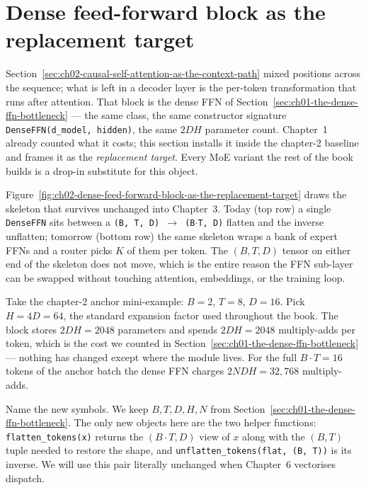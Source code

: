 \section{Dense feed-forward block as the replacement target}
\label{sec:ch02-dense-feed-forward-block-as-the-replacement-target}

Section~\ref{sec:ch02-causal-self-attention-as-the-context-path} mixed positions across the sequence; what is left in a decoder layer is the per-token transformation that runs after attention. That block is the dense FFN of Section~\ref{sec:ch01-the-dense-ffn-bottleneck} --- the same class, the same constructor signature \texttt{DenseFFN(d\_model, hidden)}, the same $2 D H$ parameter count. Chapter~1 already counted what it costs; this section installs it inside the chapter-2 baseline and frames it as the \emph{replacement target}. Every MoE variant the rest of the book builds is a drop-in substitute for this object.



Figure~\ref{fig:ch02-dense-feed-forward-block-as-the-replacement-target} draws the skeleton that survives unchanged into Chapter~3. Today (top row) a single \texttt{DenseFFN} sits between a \texttt{(B, T, D) $\to$ (B$\cdot$T, D)} flatten and the inverse unflatten; tomorrow (bottom row) the same skeleton wraps a bank of expert FFNs and a router picks $K$ of them per token. The $(B, T, D)$ tensor on either end of the skeleton does not move, which is the entire reason the FFN sub-layer can be swapped without touching attention, embeddings, or the training loop.

Take the chapter-2 anchor mini-example: $B = 2$, $T = 8$, $D = 16$. Pick $H = 4 D = 64$, the standard expansion factor used throughout the book. The block stores $2 D H = 2048$ parameters and spends $2 D H = 2048$ multiply-adds per token, which is the cost we counted in Section~\ref{sec:ch01-the-dense-ffn-bottleneck} --- nothing has changed except where the module lives. For the full $B \cdot T = 16$ tokens of the anchor batch the dense FFN charges $2 N D H = 32{,}768$ multiply-adds.

Name the new symbols. We keep $B, T, D, H, N$ from Section~\ref{sec:ch01-the-dense-ffn-bottleneck}. The only new objects here are the two helper functions: \texttt{flatten\_tokens(x)} returns the $(B \cdot T, D)$ view of $x$ along with the $(B, T)$ tuple needed to restore the shape, and \texttt{unflatten\_tokens(flat, (B, T))} is its inverse. We will use this pair literally unchanged when Chapter~6 vectorises dispatch.

